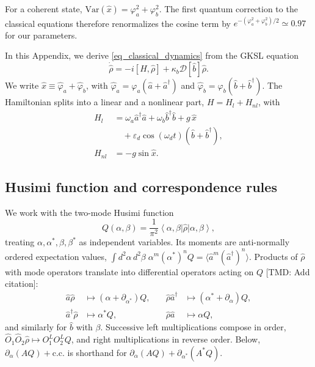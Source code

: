 \documentclass[aps,prx,reprint,floatfix,amsmath,amssymb,longbibliography]{revtex4-2}
\newcommand{\ket}[1]{\left|#1\right\rangle}
\newcommand{\bra}[1]{\left\langle#1\right|}
\newcommand{\eps}{\varepsilon}
\newcommand{\da}{^\dagger}
\newcommand{\ha}{\hat{a}}
\newcommand{\hb}{\hat{b}}
\newcommand{\TMD}[1]{{\color{Blue} [TMD: {#1}]}}
\begin{document}
For a coherent state, $\mathrm{Var}(\hat x)=\varphi_a^2+\varphi_b^2$. The first quantum correction to the classical equations therefore renormalizes the cosine term by $e^{-(\varphi_a^2+\varphi_b^2)/2}\simeq0.97$ for our parameters.

\iffalse

In this Appendix, we derive \cref{eq_classical_dynamics} from the GKSL equation
\begin{equation}
    \dot{\hat\rho} = -i[H,\hat\rho] + \kappa_b\mathcal{D}[\hb]\hat\rho .
    \label{eq_app_GKSL}
\end{equation}
We write $\hat x\equiv\hat\varphi_a+\hat\varphi_b$, with $\hat\varphi_a=\varphi_a(\ha+\ha\da)$ and $\hat\varphi_b=\varphi_b(\hb+\hb\da)$. The Hamiltonian splits into a linear and a nonlinear part, $H=H_l+H_{nl}$, with
\begin{align}
    H_l &= \omega_a\ha\da\ha+\omega_b\hb\da\hb+g\,\hat x \nonumber\\
        &\quad +\eps_d\cos(\omega_d t)(\hb+\hb\da),\\
    H_{nl} &= -g\sin\hat x .
\end{align}

\subsection{Husimi function and correspondence rules}
We work with the two-mode Husimi function
\begin{equation}
    Q(\alpha,\beta)=\frac{1}{\pi^2}\bra{\alpha,\beta}\hat\rho\ket{\alpha,\beta},
\end{equation}
treating $\alpha,\alpha^*,\beta,\beta^*$ as independent variables. Its moments are anti-normally ordered expectation values, $\int d^2\alpha\,d^2\beta\;\alpha^m(\alpha^*)^n Q=\langle\ha^m(\ha\da)^n\rangle$. Products of $\hat\rho$ with mode operators translate into differential operators acting on $Q$ \TMD{Add citation}:
\begin{equation}
\begin{aligned}
    \ha\hat\rho &\mapsto (\alpha+\partial_{\alpha^*})Q, &\quad \hat\rho\ha\da &\mapsto (\alpha^*+\partial_\alpha)Q,\\
    \ha\da\hat\rho &\mapsto \alpha^*Q, &\quad \hat\rho\ha &\mapsto \alpha Q,
\end{aligned}
\label{eq_app_rules}
\end{equation}
and similarly for $\hb$ with $\beta$. Successive left multiplications compose in order, $\hat O_1\hat O_2\hat\rho\mapsto O_1^{L}O_2^{L}Q$, and right multiplications in reverse order. Below, $\partial_\alpha(AQ)+\text{c.c.}$ is shorthand for $\partial_\alpha(AQ)+\partial_{\alpha^*}(A^*Q)$.
\end{document}
